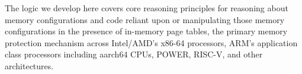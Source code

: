 The logic we develop here covers core reasoning principles for reasoning about memory configurations and code
reliant upon or manipulating those memory configurations in the presence of in-memory page tables, the primary
memory protection mechanism across Intel/AMD's x86-64 processors, ARM's application class processors including
aarch64 CPUs, POWER, RISC-V, and other architectures.
